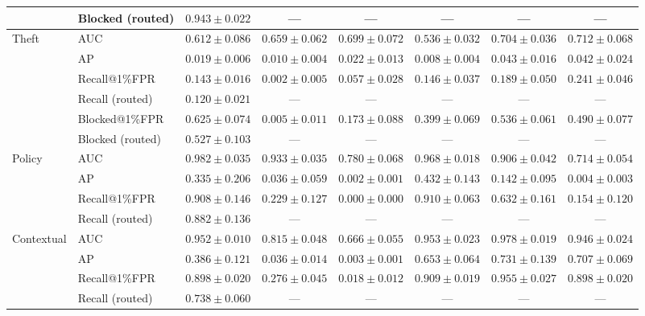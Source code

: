 \begin{table}[t]
{\begin{tabular}{llcccccc}
 & Blocked (routed) & $0.943\pm0.022$ & --- & --- & --- & --- & --- \\
\midrule
\multirow{6}{*}{Theft} & AUC & $0.612\pm0.086$ & $0.659\pm0.062$ & $0.699\pm0.072$ & $0.536\pm0.032$ & $0.704\pm0.036$ & $0.712\pm0.068$ \\
 & AP & $0.019\pm0.006$ & $0.010\pm0.004$ & $0.022\pm0.013$ & $0.008\pm0.004$ & $0.043\pm0.016$ & $0.042\pm0.024$ \\
 & Recall@1\%FPR & $0.143\pm0.016$ & $0.002\pm0.005$ & $0.057\pm0.028$ & $0.146\pm0.037$ & $0.189\pm0.050$ & $0.241\pm0.046$ \\
 & Recall (routed) & $0.120\pm0.021$ & --- & --- & --- & --- & --- \\
 & Blocked@1\%FPR & $0.625\pm0.074$ & $0.005\pm0.011$ & $0.173\pm0.088$ & $0.399\pm0.069$ & $0.536\pm0.061$ & $0.490\pm0.077$ \\
 & Blocked (routed) & $0.527\pm0.103$ & --- & --- & --- & --- & --- \\
\midrule
\multirow{4}{*}{Policy} & AUC & $0.982\pm0.035$ & $0.933\pm0.035$ & $0.780\pm0.068$ & $0.968\pm0.018$ & $0.906\pm0.042$ & $0.714\pm0.054$ \\
 & AP & $0.335\pm0.206$ & $0.036\pm0.059$ & $0.002\pm0.001$ & $0.432\pm0.143$ & $0.142\pm0.095$ & $0.004\pm0.003$ \\
 & Recall@1\%FPR & $0.908\pm0.146$ & $0.229\pm0.127$ & $0.000\pm0.000$ & $0.910\pm0.063$ & $0.632\pm0.161$ & $0.154\pm0.120$ \\
 & Recall (routed) & $0.882\pm0.136$ & --- & --- & --- & --- & --- \\
\midrule
\multirow{4}{*}{Contextual} & AUC & $0.952\pm0.010$ & $0.815\pm0.048$ & $0.666\pm0.055$ & $0.953\pm0.023$ & $0.978\pm0.019$ & $0.946\pm0.024$ \\
 & AP & $0.386\pm0.121$ & $0.036\pm0.014$ & $0.003\pm0.001$ & $0.653\pm0.064$ & $0.731\pm0.139$ & $0.707\pm0.069$ \\
 & Recall@1\%FPR & $0.898\pm0.020$ & $0.276\pm0.045$ & $0.018\pm0.012$ & $0.909\pm0.019$ & $0.955\pm0.027$ & $0.898\pm0.020$ \\
 & Recall (routed) & $0.738\pm0.060$ & --- & --- & --- & --- & --- \\
\bottomrule
\end{tabular}}
\end{table}

